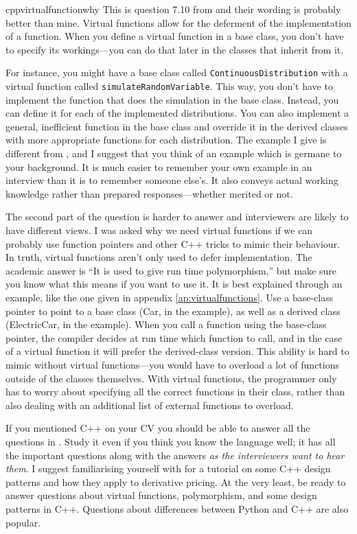 \begin{answer}{cppvirtualfunctionwhy}
This is question 7.10 from \citet{JoshiQA}
and their wording is probably better than mine.
Virtual functions allow for the  deferment of the implementation of a function.
When you define a virtual function in a base class, you don't have to specify its workings---you can do that later in the classes that inherit from it.

For instance, you might have a base class called \verb+ContinuousDistribution+ with a virtual function  called \verb+simulateRandomVariable+.
This way, you don't have to implement the function that does the simulation in the base class.
Instead, you can define it for each of the implemented distributions.
You can also implement a general, inefficient function in the base class and override it in the derived classes with more appropriate functions for each distribution.
The example I give is different from
\citet[question 7.10]{JoshiQA},
and I suggest that you think of an example which is germane to your background.
It is much easier to remember your own example in an interview than it is to remember someone else's.
It also conveys actual working knowledge rather than prepared responses---whether merited or not.


The second part of the question is harder to answer and interviewers are likely to have different views.
I was asked why we need virtual functions if we can probably use function pointers and other C++ tricks to mimic their behaviour.
In truth, virtual functions aren't only used to defer implementation.
The academic answer is ``It is used to give run time polymorphism,'' but  make sure you know what this means if you want to use it.
It is best explained through an example, like the one given in appendix \ref{ap:virtualfunctions}.
Use a base-class pointer to point to a base class (Car, in the example), as well as a derived class (ElectricCar, in the example).
When you call a function using the base-class pointer, the compiler decides at run time which function to call, and in the case of a virtual function it will prefer the derived-class version.
This ability is hard to mimic without virtual functions---you would have to overload a lot of  functions outside of the classes themselves.
With virtual functions, the programmer only has to worry about specifying all the correct functions in their class, rather than also dealing with an additional list of external functions to overload.

If you mentioned C++ on your CV you should be able to answer all the questions in
\citet[chap.~7]{JoshiQA}.
Study it even if you think you know the language well; it has all the important questions along with the answers \emph{as the interviewers want to hear them}.
I suggest familiarising yourself with \citet{joshi2008cpp} for a tutorial on some C++ design patterns and how they apply to derivative pricing.
At the very least, be ready to answer questions about virtual functions, polymorphism, and some design patterns in C++.
Questions about differences between Python and C++ are also popular.
\end{answer}
